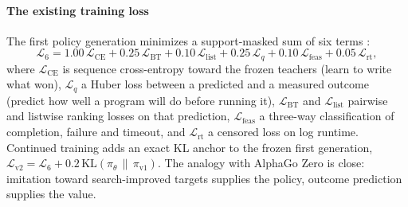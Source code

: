 \paragraph{The existing training loss} The first policy generation minimizes a support-masked sum of
six terms \citep{jopedime2026writeup}:
\begin{equation}
\mathcal{L}_6 = 1.00\,\mathcal{L}_{\mathrm{CE}} + 0.25\,\mathcal{L}_{\mathrm{BT}} + 0.10\,\mathcal{L}_{\mathrm{list}}
+ 0.25\,\mathcal{L}_{q} + 0.10\,\mathcal{L}_{\mathrm{feas}} + 0.05\,\mathcal{L}_{\mathrm{rt}} ,
\label{eq:l6}
\end{equation}
where $\mathcal{L}_{\mathrm{CE}}$ is sequence cross-entropy toward the frozen teachers (learn to
write what won), $\mathcal{L}_{q}$ a Huber loss between a predicted and a measured outcome (predict
how well a program will do before running it), $\mathcal{L}_{\mathrm{BT}}$ and
$\mathcal{L}_{\mathrm{list}}$ pairwise and listwise ranking losses on that prediction,
$\mathcal{L}_{\mathrm{feas}}$ a three-way classification of completion, failure and timeout, and
$\mathcal{L}_{\mathrm{rt}}$ a censored loss on log runtime. Continued training adds an exact KL
anchor to the frozen first generation, $\mathcal{L}_{\mathrm{v2}} = \mathcal{L}_6 +
0.2\,\mathrm{KL}(\pi_\theta \,\|\, \pi_{\mathrm{v1}})$. The analogy with AlphaGo Zero is close:
imitation toward search-improved targets supplies the policy, outcome prediction supplies the
value.

